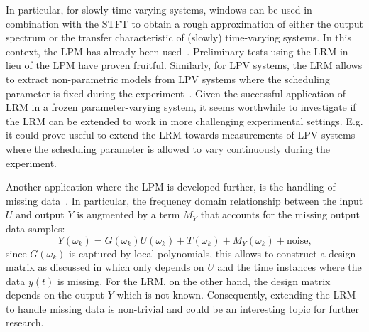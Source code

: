     In particular, for slowly time-varying systems, windows can be used in combination with the \gls{STFT} to obtain a rough approximation of either the output spectrum or the transfer characteristic of (slowly) time-varying systems.
    In this context, the \gls{LPM} has already been used~\citep{Lataire2012}.
    Preliminary tests using the \gls{LRM} in lieu of the \gls{LPM} have proven fruitful.
    Similarly, for \gls{LPV} systems, the \gls{LRM} allows to extract non-parametric models from \gls{LPV} systems where the scheduling parameter is fixed during the experiment~\citep{vanderMaas2015CDC}.
    Given the successful application of \gls{LRM} in a frozen parameter-varying system, it seems worthwhile to investigate if the \gls{LRM} can be extended to work in more challenging experimental settings.
    E.g. it could prove useful to extend the \gls{LRM} towards measurements of \gls{LPV} systems where the scheduling parameter is allowed to vary continuously during the experiment.

    Another application where the \gls{LPM} is developed further, is the handling of missing data~\citep{Ugryumova2015}.
    In particular, the frequency domain relationship between the input $U$ and output $Y$ is augmented by a term $M_Y$ that accounts for the missing output data samples:
    \begin{equation}
      Y(\omega_k) = G(\omega_k) U(\omega_k) + T(\omega_k) + M_Y(\omega_k) + \mathrm{noise}\text{,}
    \end{equation}
    since $G(\omega_k)$ is captured by local polynomials, this allows to construct a design matrix as discussed in  which only depends on $U$ and the time instances where the data $y(t)$ is missing.
    For the \gls{LRM}, on the other hand, the design matrix depends on the output $Y$ which is not known.
    Consequently, extending the \gls{LRM} to handle missing data is non-trivial and could be an interesting topic for further research.

